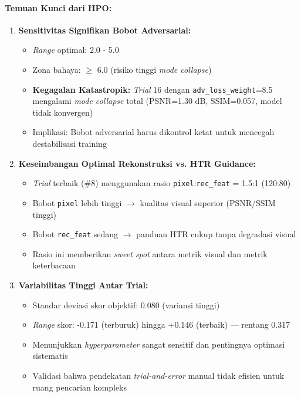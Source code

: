 \documentclass{article}
\begin{document}
\paragraph{Temuan Kunci dari HPO:}

\begin{enumerate}
    \item \textbf{Sensitivitas Signifikan Bobot Adversarial:} 
    \begin{itemize}
        \item \textit{Range} optimal: 2.0 - 5.0
        \item Zona bahaya: $\geq$ 6.0 (risiko tinggi \textit{mode collapse})
        \item \textbf{Kegagalan Katastropik:} \textit{Trial} 16 dengan \texttt{adv\_loss\_weight}=8.5 mengalami \textit{mode collapse} total (PSNR=1.30 dB, SSIM=0.057, model tidak konvergen)
        \item Implikasi: Bobot adversarial harus dikontrol ketat untuk mencegah destabilisasi training
    \end{itemize}
    
    \item \textbf{Keseimbangan Optimal Rekonstruksi vs. HTR Guidance:}
    \begin{itemize}
        \item \textit{Trial} terbaik (\#8) menggunakan rasio \texttt{pixel}:\texttt{rec\_feat} = 1.5:1 (120:80)
        \item Bobot \texttt{pixel} lebih tinggi $\rightarrow$ kualitas visual superior (PSNR/SSIM tinggi)
        \item Bobot \texttt{rec\_feat} sedang $\rightarrow$ panduan HTR cukup tanpa degradasi visual
        \item Rasio ini memberikan \textit{sweet spot} antara metrik visual dan metrik keterbacaan
    \end{itemize}
    
    \item \textbf{Variabilitas Tinggi Antar Trial:}
    \begin{itemize}
        \item Standar deviasi skor objektif: 0.080 (variansi tinggi)
        \item \textit{Range} skor: -0.171 (terburuk) hingga +0.146 (terbaik) — rentang 0.317
        \item Menunjukkan \textit{hyperparameter} sangat sensitif dan pentingnya optimasi sistematis
        \item Validasi bahwa pendekatan \textit{trial-and-error} manual tidak efisien untuk ruang pencarian kompleks
    \end{itemize}
    

\end{enumerate}
\end{document}
